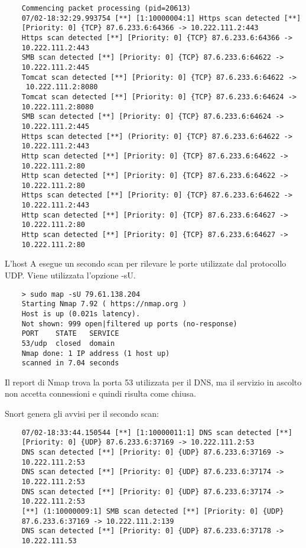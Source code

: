 \begin{verbatim}
    Commencing packet processing (pid=20613)
    07/02-18:32:29.993754 [**] [1:10000004:1] Https scan detected [**] 
    [Priority: 0] {TCP} 87.6.233.6:64366 -> 10.222.111.2:443
    Https scan detected [**] [Priority: 0] {TCP} 87.6.233.6:64366 -> 
    10.222.111.2:443
    SMB scan detected [**] [Priority: 0] {TCP} 87.6.233.6:64622 -> 
    10.222.111.2:445
    Tomcat scan detected [**] [Priority: 0] {TCP} 87.6.233.6:64622 ->
     10.222.111.2:8080
    Tomcat scan detected [**] [Priority: 0] {TCP} 87.6.233.6:64624 ->
    10.222.111.2:8080
    SMB scan detected [**] [Priority: 0] {TCP} 87.6.233.6:64624 ->
    10.222.111.2:445
    Https scan detected [**] (Priority: 0] {TCP} 87.6.233.6:64622 -> 
    10.222.111.2:443
    Http scan detected [**] [Priority: 0] {TCP} 87.6.233.6:64622 ->
    10.222.111.2:80
    Http scan detected [**] [Priority: 0] {TCP} 87.6.233.6:64622 ->
    10.222.111.2:80
    Https scan detected [**] [Priority: 0] {TCP} 87.6.233.6:64622 -> 
    10.222.111.2:443
    Http scan detected [**] [Priority: 0] {TCP} 87.6.233.6:64627 -> 
    10.222.111.2:80
    Http scan detected [**] [Priority: 0] {TCP} 87.6.233.6:64627 ->
    10.222.111.2:80
\end{verbatim}

L'host A esegue un secondo scan per rilevare le porte utilizzate dal protocollo UDP. Viene utilizzata l'opzione -sU.

\begin{verbatim}
    > sudo map -sU 79.61.138.204
    Starting Nmap 7.92 ( https://nmap.org ) 
    Host is up (0.021s latency).
    Not shown: 999 open|filtered up ports (no-response)
    PORT    STATE   SERVICE
    53/udp  closed  domain
    Nmap done: 1 IP address (1 host up)
    scanned in 7.04 seconds
\end{verbatim}

Il report di Nmap trova la porta 53 utilizzata per il DNS, ma il servizio in ascolto non accetta connessioni e quindi risulta come chiusa.

Snort genera gli avvisi per il secondo scan:

\begin{verbatim}
    07/02-18:33:44.150544 [**] [1:10000011:1] DNS scan detected [**] 
    [Priority: 0] {UDP} 87.6.233.6:37169 -> 10.222.111.2:53
    DNS scan detected [**] [Priority: 0] {UDP} 87.6.233.6:37169 ->
    10.222.111.2:53
    DNS scan detected [**] [Priority: 0] {UDP} 87.6.233.6:37174 ->
    10.222.111.2:53
    DNS scan detected [**] [Priority: 0] {UDP} 87.6.233.6:37174 ->
    10.222.111.2:53
    [**] (1:10000009:1] SMB scan detected [**] [Priority: 0] {UDP} 
    87.6.233.6:37169 -> 10.222.111.2:139
    DNS scan detected [**] [Priority: 0] {UDP} 87.6.233.6:37178 -> 
    10.222.111.53
\end{verbatim}


